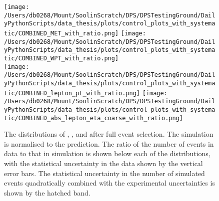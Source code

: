 \begin{figure}[hp!]
	\centering
	\texttt{[image: /Users/db0268/Mount/SoolinScratch/DPS/DPSTestingGround/DailyPythonScripts/data\_thesis/plots/control\_plots\_with\_systematic/COMBINED\_MET\_with\_ratio.png]}
	\texttt{[image: /Users/db0268/Mount/SoolinScratch/DPS/DPSTestingGround/DailyPythonScripts/data\_thesis/plots/control\_plots\_with\_systematic/COMBINED\_WPT\_with\_ratio.png]} \\
	\texttt{[image: /Users/db0268/Mount/SoolinScratch/DPS/DPSTestingGround/DailyPythonScripts/data\_thesis/plots/control\_plots\_with\_systematic/COMBINED\_lepton\_pt\_with\_ratio.png]} 
	\texttt{[image: /Users/db0268/Mount/SoolinScratch/DPS/DPSTestingGround/DailyPythonScripts/data\_thesis/plots/control\_plots\_with\_systematic/COMBINED\_abs\_lepton\_eta\_coarse\_with\_ratio.png]}
	\caption[The distributions of \ptmiss, \WPT, \LPT and \LETA after full event selection. The \ttbar{} simulation is normalised to the \NNLO{} prediction. The ratio of the number of events in data to that in simulation is shown below each of the distributions, with the statistical uncertainty in the data shown by the vertical error bars. The statistical uncertainty in the number of simulated events quadratically combined with the experimental uncertainties is shown by the hatched band.]{The distributions of \ptmiss, \WPT, \LPT and \LETA after full event selection. The \ttbar{} simulation is normalised to the \NNLO{} prediction. The ratio of the number of events in data to that in simulation is shown below each of the distributions, with the statistical uncertainty in the data shown by the vertical error bars. The statistical uncertainty in the number of simulated events quadratically combined with the experimental uncertainties is shown by the hatched band.}
	\label{fig:combControlPlot2}
\end{figure}